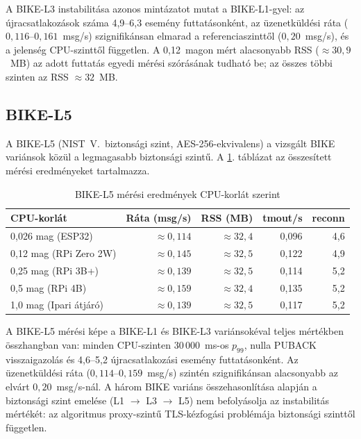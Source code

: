A BIKE-L3 instabilitása azonos mintázatot mutat a BIKE-L1-gyel: az újracsatlakozások
száma 4,9--6,3 esemény futtatásonként, az üzenetküldési ráta ($0{,}116$--$0{,}161$~msg/s)
szignifikánsan elmarad a referenciaszinttől ($0{,}20$~msg/s), és a jelenség CPU-szinttől
független. A 0,12~magon mért alacsonyabb RSS ($\approx 30{,}9$~MB) az adott futtatás
egyedi mérési szórásának tudható be; az összes többi szinten az RSS $\approx 32$~MB.

\subsection{BIKE-L5}

A BIKE-L5 (NIST~V.\ biztonsági szint, AES-256-ekvivalens) a vizsgált BIKE variánsok
közül a legmagasabb biztonsági szintű. A \ref{tab:bikel5-results}. táblázat
az összesített mérési eredményeket tartalmazza.

\begin{table}[ht]
\centering
\caption{BIKE-L5 mérési eredmények CPU-korlát szerint}
\label{tab:bikel5-results}
\begin{tabular}{lrrrr}
\hline
\textbf{CPU-korlát} & \textbf{Ráta (msg/s)} & \textbf{RSS (MB)} & \textbf{tmout/s} & \textbf{reconn} \\
\hline
0,026 mag (ESP32)       & $\approx 0{,}114$ & $\approx 32{,}4$ & 0,096 & 4,6 \\
0,12 mag (RPi Zero 2W)  & $\approx 0{,}145$ & $\approx 32{,}5$ & 0,122 & 4,9 \\
0,25 mag (RPi 3B+)      & $\approx 0{,}139$ & $\approx 32{,}5$ & 0,114 & 5,2 \\
0,5 mag (RPi 4B)        & $\approx 0{,}159$ & $\approx 32{,}4$ & 0,135 & 5,2 \\
1,0 mag (Ipari átjáró)  & $\approx 0{,}139$ & $\approx 32{,}5$ & 0,117 & 5,2 \\
\hline
\end{tabular}
\end{table}

A BIKE-L5 mérési képe a BIKE-L1 és BIKE-L3 variánsokéval teljes mértékben összhangban
van: minden CPU-szinten 30\,000~ms-os $p_{99}$, nulla PUBACK visszaigazolás és
4,6--5,2 újracsatlakozási esemény futtatásonként. Az üzenetküldési ráta
($0{,}114$--$0{,}159$~msg/s) szintén szignifikánsan alacsonyabb az elvárt
$0{,}20$~msg/s-nál. A három BIKE variáns összehasonlítása alapján a biztonsági szint
emelése (L1 $\to$ L3 $\to$ L5) nem befolyásolja az instabilitás mértékét: az
algoritmus proxy-szintű TLS-kézfogási problémája biztonsági szinttől független.


